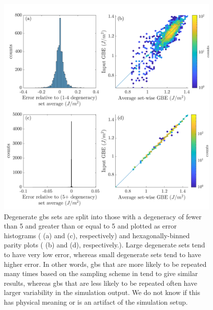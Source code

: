 \documentclass[preprint,12pt]{elsarticle}
\newcommand{\inpt}{input}
\begin{document}
\begin{figure}
    \centering
    \includegraphics{kim-interp-degeneracy-results.png}
    \caption{Degenerate \glspl{gb} sets are split into those with a degeneracy of fewer than 5 and greater than or equal to 5 and plotted as error histograms ( (a) and (c), respectively) and hexagonally-binned parity plots ( (b) and (d), respectively.). Large degenerate sets tend to have very low error, whereas small degenerate sets tend to have higher error. In other words, \glspl{gb} that are more likely to be repeated many times based on the sampling scheme in \cite{kimPhasefieldModeling3D2014} tend to give similar results, whereas \glspl{gb} that are less likely to be repeated often have larger variability in the simulation output. We do not know if this has physical meaning or is an artifact of the simulation setup.}
    \label{fig:kim-interp-degeneracy-results}
\end{figure}



\newpage
\clearpage


\end{document}
